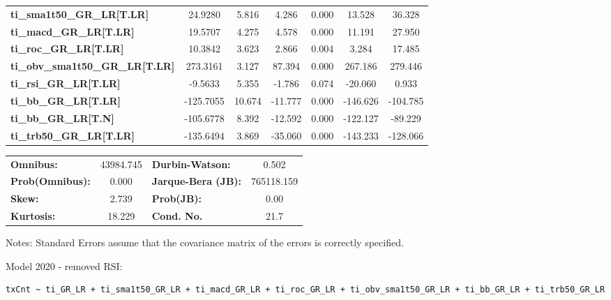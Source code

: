 \begin{center}
\begin{tabular}{lcccccc}
\textbf{ti\_sma1t50\_GR\_LR[T.LR]}      &      24.9280  &        5.816     &     4.286  &         0.000        &       13.528    &       36.328     \\
\textbf{ti\_macd\_GR\_LR[T.LR]}         &      19.5707  &        4.275     &     4.578  &         0.000        &       11.191    &       27.950     \\
\textbf{ti\_roc\_GR\_LR[T.LR]}          &      10.3842  &        3.623     &     2.866  &         0.004        &        3.284    &       17.485     \\
\textbf{ti\_obv\_sma1t50\_GR\_LR[T.LR]} &     273.3161  &        3.127     &    87.394  &         0.000        &      267.186    &      279.446     \\
\textbf{ti\_rsi\_GR\_LR[T.LR]}          &      -9.5633  &        5.355     &    -1.786  &         0.074        &      -20.060    &        0.933     \\
\textbf{ti\_bb\_GR\_LR[T.LR]}           &    -125.7055  &       10.674     &   -11.777  &         0.000        &     -146.626    &     -104.785     \\
\textbf{ti\_bb\_GR\_LR[T.N]}            &    -105.6778  &        8.392     &   -12.592  &         0.000        &     -122.127    &      -89.229     \\
\textbf{ti\_trb50\_GR\_LR[T.LR]}        &    -135.6494  &        3.869     &   -35.060  &         0.000        &     -143.233    &     -128.066     \\
\bottomrule
\end{tabular}
\begin{tabular}{lclc}
\textbf{Omnibus:}       & 43984.745 & \textbf{  Durbin-Watson:     } &     0.502   \\
\textbf{Prob(Omnibus):} &    0.000  & \textbf{  Jarque-Bera (JB):  } & 765118.159  \\
\textbf{Skew:}          &    2.739  & \textbf{  Prob(JB):          } &      0.00   \\
\textbf{Kurtosis:}      &   18.229  & \textbf{  Cond. No.          } &      21.7   \\
\bottomrule
\end{tabular}
\end{center}

Notes: \newline
 [1] Standard Errors assume that the covariance matrix of the errors is correctly specified.

Model 2020 - removed RSI: \begin{verbatim}txCnt ~ ti_GR_LR + ti_sma1t50_GR_LR + ti_macd_GR_LR + ti_roc_GR_LR + ti_obv_sma1t50_GR_LR + ti_bb_GR_LR + ti_trb50_GR_LR\end{verbatim}

